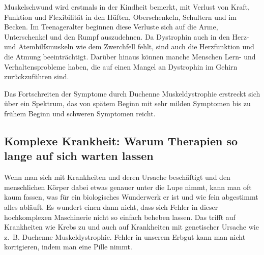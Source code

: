 \documentclass[fontsize=14pt,a4paper,headinclude,DIV=calc,automark]{scrbook}
\begin{document}
Muskelschwund wird erstmals in der Kindheit bemerkt, mit Verlust von Kraft, Funktion und Flexibilität in den Hüften, Oberschenkeln, Schultern und im Becken. Im Teenageralter beginnen diese Verluste sich auf die Arme, Unterschenkel und den Rumpf auszudehnen. Da Dystrophin auch in den Herz- und Atemhilfsmuskeln wie dem Zwerchfell fehlt, sind auch die Herzfunktion und die Atmung beeinträchtigt. Darüber hinaus können manche Menschen Lern- und Verhaltensprobleme haben, die auf einen Mangel an Dystrophin im Gehirn zurückzuführen sind.

Das Fortschreiten der Symptome durch Duchenne Muskeldystrophie erstreckt sich über ein Spektrum, das von spätem Beginn mit sehr milden Symptomen bis zu frühem Beginn und schweren Symptomen reicht.


\subsection{Komplexe Krankheit: Warum Therapien so lange auf sich warten lassen}

Wenn man sich mit Krankheiten und deren Ursache beschäftigt und den menschlichen Körper dabei etwas genauer unter die Lupe nimmt, kann man oft kaum fassen, was für ein biologisches Wunderwerk er ist und wie fein abgestimmt alles abläuft. Es wundert einen dann nicht, dass sich Fehler in dieser hochkomplexen Maschinerie nicht so einfach beheben lassen. Das trifft auf Krankheiten wie Krebs zu und auch auf Krankheiten mit genetischer Ursache wie z. B. Duchenne Muskeldystrophie. Fehler in unserem Erbgut kann man nicht korrigieren, indem man eine Pille nimmt.
\end{document}

